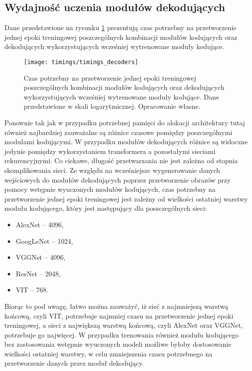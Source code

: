 \subsection{Wydajność uczenia modułów dekodujących}
Dane przedstawione na rysunku \ref{fig:timings-decoders} prezentują czas potrzebny na przetworzenie jednej epoki treningowej poszczególnych kombinacji modułów kodujących oraz dekodujących wykorzystujących wcześniej wytrenowane moduły kodujące.
\begin{figure}[H]
    \centering
    \texttt{[image: timings/timings\_decoders]}
    \caption{Czas potrzebny na przetworzenie jednej epoki treningowej poszczególnych kombinacji modułów kodujących oraz dekodujących wykorzystujących wcześniej wytrenowane moduły kodujące. Dane przedstawione w skali logarytmicznej. Opracowanie własne.}
    \label{fig:timings-decoders}
\end{figure}
\noindent Ponownie tak jak w przypadku potrzebnej pamięci do alokacji architektury tutaj również najbardziej zauważalne są różnice czasowe pomiędzy poszczególnymi modułami kodującymi. W przypadku modułów dekodujących różnice są widoczne jedynie pomiędzy wykorzystaniem transformera a pozostałymi sieciami rekurencyjnymi. Co ciekawe, długość przetwarzania nie jest zależna od stopnia skomplikowania sieci. Ze względu na wcześniejsze wygenerowanie danych wejściowych do modułów dekodujących poprzez przetworzenie obrazów przy pomocy wstępnie wyuczonych modułów kodujących, czas potrzebny na przetworzenie jednej epoki treningowej jest zależny od wielkości ostatniej warstwy modułu kodującego, który jest następujący dla poszczególnych sieci:
\begin{itemize}
    \item AlexNet -- 4096,
    \item GoogLeNet -- 1024,
    \item VGGNet -- 4096,
    \item ResNet -- 2048,
    \item VIT -- 768.
\end{itemize}
Biorąc to pod uwagę, łatwo można zauważyć, iż sieć z najmniejszą warstwą końcową, czyli VIT, potrzebuje najmniej czasu na przetworzenie jednej epoki treningowej, a sieci z największą warstwą końcową, czyli AlexNet oraz VGGNet, potrzebuje go najwięcej. W przypadku trenowania również modułu kodującego bez zastosowania wstępnie wyuczonych modeli możliwe byłoby dostosowanie wielkości ostatniej warstwy, w celu zmniejszenia czasu potrzebnego na przetworzenie danych przez moduł dekodujący.
